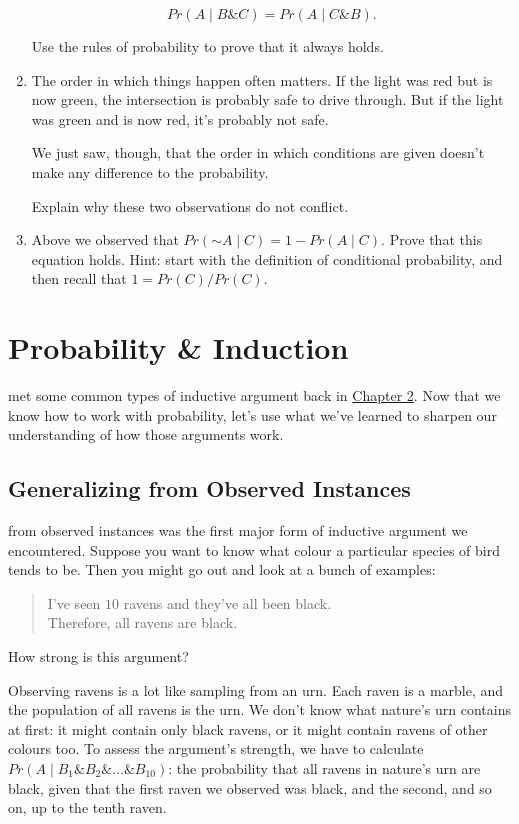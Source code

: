 \documentclass[justified]{tufte-book}
\newcommand{\given}{\mid}
\renewcommand{\neg}{\mathbin{\sim}}
\renewcommand{\wedge}{\mathbin{\&}}
\newcommand{\p}{Pr}
\newenvironment{argument}{\begin{quote}\normalsize}{\end{quote}}
\theoremstyle{definition}
\theoremstyle{definition}
\theoremstyle{definition}
\theoremstyle{remark}
\begin{document}
\begin{enumerate}
  \[ \p(A \given B \wedge C) = \p(A \given C \wedge B).\]

  Use the rules of probability to prove that it always holds.
\item
  The order in which things happen often matters. If the light was red
  but is now green, the intersection is probably safe to drive through.
  But if the light was green and is now red, it's probably not safe.

  We just saw, though, that the order in which conditions are given
  doesn't make any difference to the probability.

  Explain why these two observations do not conflict.
\item
  Above we observed that \(\p(\neg A \given C) = 1 - \p(A \given C)\).
  Prove that this equation holds. Hint: start with the definition of
  conditional probability, and then recall that \(1 = \p(C) / \p(C)\).
\end{enumerate}

\hypertarget{probability-induction}{%
\chapter{Probability \& Induction}\label{probability-induction}}

 met some common types of inductive argument back in
\protect\hyperlink{indargs}{Chapter 2}. Now that we know how to work
with probability, let's use what we've learned to sharpen our
understanding of how those arguments work.

\hypertarget{generalizing-from-observed-instances}{%
\section{Generalizing from Observed
Instances}\label{generalizing-from-observed-instances}}

 from observed instances was the first major
form of inductive argument we encountered. Suppose you want to know what
colour a particular species of bird tends to be. Then you might go out
and look at a bunch of examples:

\begin{argument}
I've seen \(10\) ravens and they've all been black.\\
Therefore, all ravens are black.
\end{argument}

How strong is this argument?

Observing ravens is a lot like sampling from an urn. Each raven is a
marble, and the population of all ravens is the urn. We don't know what
nature's urn contains at first: it might contain only black ravens, or
it might contain ravens of other colours too. To assess the argument's
strength, we have to calculate
\(\p(A \given B_1 \wedge B_2 \wedge \ldots \wedge B_{10})\): the
probability that all ravens in nature's urn are black, given that the
first raven we observed was black, and the second, and so on, up to the
tenth raven.
\end{document}
